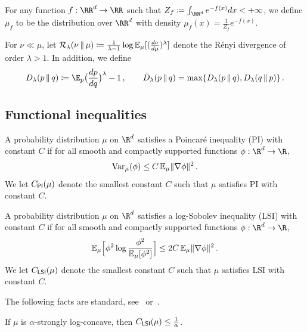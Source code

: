 For any function $f:\RR^d\to\RR$ such that $Z_f\deq \int_{\RR^d} e^{-f(x)}dx<+\infty$, we define $\mu_f$ to be the distribution over $\RR^d$ with density $\mu_f(x)=\frac{1}{Z_f}e^{-f(x)}$.

For $\nu \ll \mu$, let $\Ren[\lambda]{\nu}{\mu} \deq \frac{1}{\lambda-1} \log \En_\mu[(\frac{d\nu}{d\mu})^\lambda]$ denote the R\'enyi divergence of order $\lambda > 1$. In addition, we define
\begin{align}
    \Dren{p}{q} \deq \E_p\prn[\big]{\frac{dp}{dq}}^\lambda - 1\,,\qquad
    \Dsys{p}{q}=\max\crl{\Dren{p}{q},\Dren{q}{p}}\,.
\end{align}


\subsection{Functional inequalities}


\begin{definition}[PI]\label{def:PI}
A probability distribution $\mu$ on $\R^d$ satisfies a Poincar\'e inequality (PI) with constant $C$ if for all smooth and compactly supported functions $\phi:\R^d\to \R$,
\begin{align*}
    \var_\mu(\phi)\leq C\En_\mu \nrm{\nabla \phi}^2\,.
\end{align*}
We let $\CPI(\mu)$ denote the smallest constant $C$ such that $\mu$ satisfies PI with constant $C$.
\end{definition}

\begin{definition}[LSI]\label{def:LSI}
A probability distribution $\mu$ on $\R^d$ satisfies a log-Sobolev inequality (LSI) with constant $C$ if for all smooth and compactly supported functions $\phi:\R^d\to \R$,
\begin{align*}
    \En_\mu\brk[\Big]{ \phi^2 \log \frac{\phi^2}{\En_\mu[\phi^2]}}\leq 2C\En_\mu \nrm{\nabla \phi}^2\,.
\end{align*}
We let $\CLSI(\mu)$ denote the smallest constant $C$ such that $\mu$ satisfies LSI with constant $C$.
\end{definition}

The following facts are standard, see~\citet{BGL14} or~\citet[Chapter 2]{Chewi26Book}.

\begin{lemma}\label{lem:LSI-SC}
If $\mu$ is $\alpha$-strongly log-concave, then $\CLSI(\mu)\leq \frac{1}{\alpha}$.
\end{lemma}

